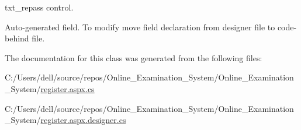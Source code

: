 txt\+\_\+repass control. 

Auto-\/generated field. To modify move field declaration from designer file to code-\/behind file. 

The documentation for this class was generated from the following files\+:\begin{DoxyCompactItemize}
\item 
C\+:/\+Users/dell/source/repos/\+Online\+\_\+\+Examination\+\_\+\+System/\+Online\+\_\+\+Examination\+\_\+\+System/\mbox{\hyperlink{register_8aspx_8cs}{register.\+aspx.\+cs}}\item 
C\+:/\+Users/dell/source/repos/\+Online\+\_\+\+Examination\+\_\+\+System/\+Online\+\_\+\+Examination\+\_\+\+System/\mbox{\hyperlink{register_8aspx_8designer_8cs}{register.\+aspx.\+designer.\+cs}}\end{DoxyCompactItemize}
